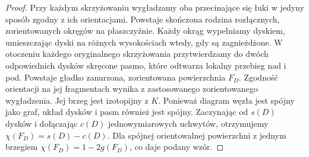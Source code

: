 \documentclass[11pt,a4paper]{report}
\numberwithin{equation}{section}
\theoremstyle{plain}
\theoremstyle{definition}
\theoremstyle{remark}
\begin{document}
\begin{proof}
Przy każdym skrzyżowaniu wygładzamy oba przecinające się łuki
w jedyny sposób zgodny z ich orientacjami. Powstaje skończona
rodzina rozłącznych, zorientowanych okręgów na płaszczyźnie.
Każdy okrąg wypełniamy dyskiem, umieszczając dyski na różnych
wysokościach wtedy, gdy są zagnieżdżone. W otoczeniu każdego
oryginalnego skrzyżowania przytwierdzamy do dwóch odpowiednich
dysków skręcone pasmo, które odtwarza lokalny przebieg nad i pod.
Powstaje gładko zanurzona, zorientowana powierzchnia $F_D$.
Zgodność orientacji na jej fragmentach wynika z zastosowanego
zorientowanego wygładzenia. Jej brzeg jest izotopijny z $K$.
Ponieważ diagram węzła jest spójny jako graf, układ dysków
i pasm również jest spójny. Zaczynając od $s(D)$ dysków
i dołączając $c(D)$ jednowymiarowych uchwytów, otrzymujemy
$\chi(F_D)=s(D)-c(D)$. Dla spójnej orientowalnej powierzchni
z jednym brzegiem $\chi(F_D)=1-2g(F_D)$, co daje podany wzór.
\end{proof}

\begin{center}
\end{center}
\end{document}

